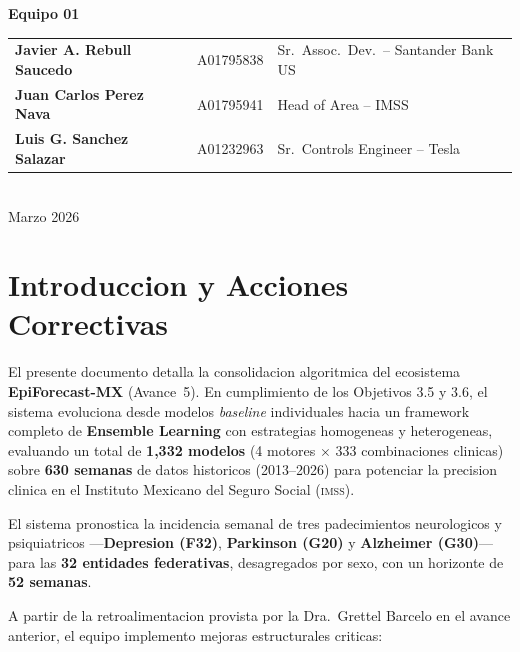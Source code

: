 \documentclass[12pt, letterpaper]{article}
\newcommand{\imss}{\textsc{imss}}
\begin{document}
\begin{titlepage}
\begin{center}
\textbf{\Large Equipo 01}\\[0.4cm]
\begin{tabular}{lll}
\textbf{Javier A. Rebull Saucedo} & A01795838 & Sr.\ Assoc.\ Dev.\ -- Santander Bank US \\
\textbf{Juan Carlos Perez Nava}   & A01795941 & Head of Area -- IMSS \\
\textbf{Luis G. Sanchez Salazar}  & A01232963 & Sr.\ Controls Engineer -- Tesla \\
\end{tabular}\\[1.0cm]

{\large Marzo 2026}

\end{center}
\end{titlepage}

\newpage
\tableofcontents
\newpage

\section{Introduccion y Acciones Correctivas}\label{sec:intro}

El presente documento detalla la consolidacion algoritmica del ecosistema \textbf{EpiForecast-MX} (Avance~5). En cumplimiento de los Objetivos 3.5 y 3.6, el sistema evoluciona desde modelos \textit{baseline} individuales hacia un framework completo de \textbf{Ensemble Learning} con estrategias homogeneas y heterogeneas, evaluando un total de \textbf{1,332 modelos} (4 motores $\times$ 333 combinaciones clinicas) sobre \textbf{630 semanas} de datos historicos (2013--2026) para potenciar la precision clinica en el Instituto Mexicano del Seguro Social (\imss{}).

El sistema pronostica la incidencia semanal de tres padecimientos neurologicos y psiquiatricos ---\textbf{Depresion (F32)}, \textbf{Parkinson (G20)} y \textbf{Alzheimer (G30)}--- para las \textbf{32 entidades federativas}, desagregados por sexo, con un horizonte de \textbf{52 semanas}.

A partir de la retroalimentacion provista por la Dra.\ Grettel Barcelo en el avance anterior, el equipo implemento mejoras estructurales criticas:
\end{document}
